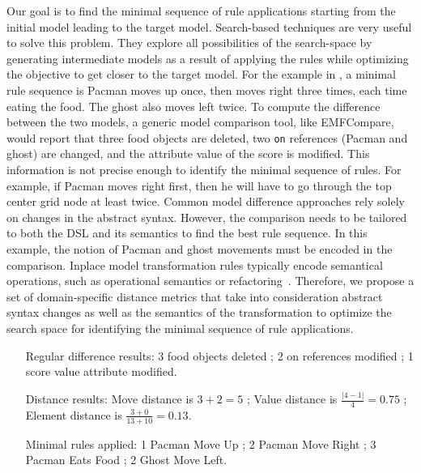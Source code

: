 Our goal is to find the minimal sequence of rule applications starting from the initial model leading to the target model.
Search-based techniques are very useful to solve this problem.
They explore all possibilities of the search-space by generating intermediate models as a result of applying the rules while optimizing the objective to get closer to the target model.
For the example in , a minimal rule sequence is Pacman moves up once, then moves right three times, each time eating the food.
The ghost also moves left twice.
To compute the difference between the two models, a generic model comparison tool, like EMFCompare, would report that three food objects are deleted, two \texttt{on} references (Pacman and ghost) are changed, and the attribute value of the score is modified.
This information is not precise enough to identify the minimal sequence of rules.
For example, if Pacman moves right first, then he will have to go through the top center grid node at least twice.
Common model difference approaches rely solely on changes in the abstract syntax.
However, the comparison needs to be tailored to both the DSL and its semantics to find the best rule sequence.
In this example, the notion of Pacman and ghost movements must be encoded in the comparison.
Inplace model transformation rules typically encode semantical operations, such as operational semantics or refactoring~\cite{Lucio2016}.
Therefore, we propose a set of domain-specific distance metrics that take into consideration abstract syntax changes as well as the semantics of the transformation to optimize the search space for identifying the minimal sequence of rule applications.

\begin{itemize}
    \item[Regular difference results:]
        3 food objects deleted ;
        2 on references modified ;
        1 score value attribute modified.
    
    \item[Distance results:]
        Move distance is $3+2=5$ ;
        Value distance is $\frac{|4-1|}{4}=0.75$ ;
        Element distance is $\frac{3+0}{13+10}=0.13$.
    
    \item[Minimal rules applied:]
        1 Pacman Move Up ;
        2 Pacman Move Right ;
        3 Pacman Eats Food ;
        2 Ghost Move Left.
\end{itemize}

